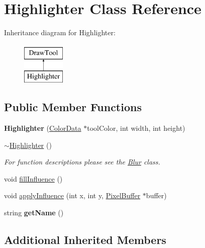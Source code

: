 \hypertarget{classHighlighter}{}\section{Highlighter Class Reference}
\label{classHighlighter}
Inheritance diagram for Highlighter\+:\begin{figure}[H]
\begin{center}
\leavevmode
\includegraphics[height=2.000000cm]{classHighlighter}
\end{center}
\end{figure}
\subsection*{Public Member Functions}
\begin{DoxyCompactItemize}
\item 
{\bfseries Highlighter} (\hyperlink{classColorData}{Color\+Data} $\ast$tool\+Color, int width, int height)\hypertarget{classHighlighter_aec9c28167c01f98e3da6eb38e64e6c67}{}\label{classHighlighter_aec9c28167c01f98e3da6eb38e64e6c67}

\item 
\hyperlink{classHighlighter_a3c339de18ac3c2334b69480baee54dd5}{$\sim$\+Highlighter} ()
\begin{DoxyCompactList}\small\item\em For function descriptions please see the \hyperlink{classBlur}{Blur} class. \end{DoxyCompactList}\item 
void \hyperlink{classHighlighter_ab2d858cc3fbddace3f64688293cad8e1}{fill\+Influence} ()
\item 
void \hyperlink{classHighlighter_a28e750d99d9aa85521427001ef73be0d}{apply\+Influence} (int x, int y, \hyperlink{classPixelBuffer}{Pixel\+Buffer} $\ast$buffer)
\item 
string {\bfseries get\+Name} ()\hypertarget{classHighlighter_aab9bc271db3cc23737e7604a9ab29211}{}\label{classHighlighter_aab9bc271db3cc23737e7604a9ab29211}

\end{DoxyCompactItemize}
\subsection*{Additional Inherited Members}


